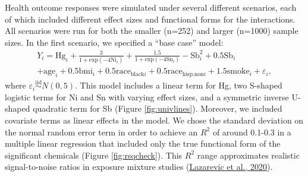 \documentclass[12pt, twoside]{amherstthesis}
\begin{document}
Health outcome responses were simulated under several different scenarios, each of which included different effect sizes and functional forms for the interactions. All scenarios were run for both the smaller (n=252) and larger (n=1000) sample sizes. In the first scenario, we specified a ``base case'' model:
\begin{multline*}
Y_i = \textrm{Hg}_i + \frac{3}{1+\textrm{exp}(-4\textrm{Ni}_i)} + \frac{1.5}{1+\textrm{exp}(-4\textrm{Sn}_i)} - \textrm{Sb}_i^2 + 0.5\textrm{Sb}_i\\
+ \textrm{age}_i + 0.5\textrm{bmi}_i + 0.5\textrm{race}_{\textrm{black}i} + 0.5\textrm{race}_{\textrm{hisp.non}i} + 1.5\textrm{smoke}_i + \varepsilon_i,
\end{multline*}
\noindent where \(\varepsilon_i \overset{\mathrm{iid}}{\sim} N(0,5)\). This model includes a linear term for Hg, two S-shaped logistic terms for Ni and Sn with varying effect sizes, and a symmetric inverse U-shaped quadratic term for Sb (Figure \ref{fig:univlines}). Moreover, we included covariate terms as linear effects in the model. We chose the standard deviation on the normal random error term in order to achieve an \(R^2\) of around 0.1-0.3 in a multiple linear regression that included only the true functional form of the significant chemicals (Figure \ref{fig:rsqcheck}). This \(R^2\) range approximates realistic signal-to-noise ratios in exposure mixture studies (\protect\hyperlink{ref-lazarevic_performance_2020}{Lazarevic et al., 2020}).
\end{document}
